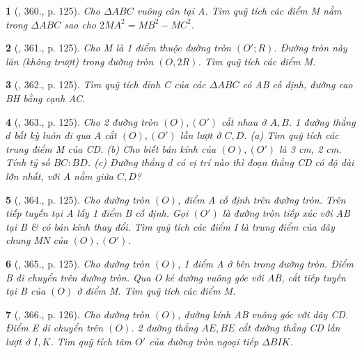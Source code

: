 \documentclass{article}
\newtheorem{baitoan}{}
\begin{document}
\begin{baitoan}[\cite{Binh_Toan_9_tap_2}, 360., p. 125]
	Cho $\Delta ABC$ vuông cân tại A. Tìm quỹ tích các điểm M nằm trong $\Delta ABC$ sao cho $2MA^2 = MB^2 - MC^2$.
\end{baitoan}

\begin{baitoan}[\cite{Binh_Toan_9_tap_2}, 361., p. 125]
	Cho M là 1 điểm thuộc đường tròn $(O';R)$. Đường tròn này lăn (không trượt) trong đường tròn $(O,2R)$. Tìm quỹ tích các điểm M.
\end{baitoan}

\begin{baitoan}[\cite{Binh_Toan_9_tap_2}, 362., p. 125]
	Tìm quỹ tích đỉnh C của các $\Delta ABC$ có AB cố định, đường cao BH bằng cạnh AC.
\end{baitoan}

\begin{baitoan}[\cite{Binh_Toan_9_tap_2}, 363., p. 125]
	Cho 2 đường tròn $(O),(O')$ cắt nhau ở $A,B$. 1 đường thẳng $d$ bất kỳ luôn đi qua A cắt $(O),(O')$ lần lượt ở $C,D$. (a) Tìm quỹ tích các trung điểm M của CD. (b) Cho biết bán kính của $(O),(O')$ là {\rm3 cm, 2 cm}. Tính tỷ số $BC:BD$. (c) Đường thẳng $d$ có vị trí nào thì đoạn thẳng CD có độ dài lớn nhất, với A nằm giữa $C,D$?
\end{baitoan}

\begin{baitoan}[\cite{Binh_Toan_9_tap_2}, 364., p. 125]
	Cho đường tròn $(O)$, điểm A cố định trên đường tròn. Trên tiếp tuyến tại A lấy 1 điểm B cố định. Gọi $(O')$ là đường tròn tiếp xúc với AB tại B \& có bán kính thay đổi. Tìm quỹ tích các điểm I là trung điểm của dây chung MN của $(O),(O')$.
\end{baitoan}

\begin{baitoan}[\cite{Binh_Toan_9_tap_2}, 365., p. 125]
	Cho đường tròn $(O)$, 1 điểm A ở bên trong đường tròn. Điểm B di chuyển trên đường tròn. Qua O kẻ đường vuông góc với AB, cắt tiếp tuyến tại B của $(O)$ ở điểm M. Tìm quỹ tích các điểm M.
\end{baitoan}

\begin{baitoan}[\cite{Binh_Toan_9_tap_2}, 366., p. 126]
	Cho đường tròn $(O)$, đường kính AB vuông góc với dây CD. Điểm E di chuyển trên $(O)$. 2 đường thẳng $AE,BE$ cắt đường thẳng CD lần lượt ở $I,K$. Tìm quỹ tích tâm $O'$ của đường tròn ngoại tiếp $\Delta BIK$.
\end{baitoan}
\end{document}
